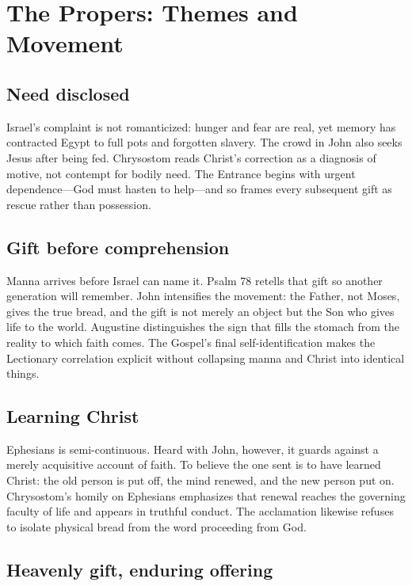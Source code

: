 \label{triptych:brief-synthesis:start}
\section*{The Propers: Themes and Movement}

\subsection*{Need disclosed}

Israel's complaint is not romanticized: hunger and fear are real, yet memory
has contracted Egypt to full pots and forgotten slavery. The crowd in John
also seeks Jesus after being fed. Chrysostom reads Christ's correction as a
diagnosis of motive, not contempt for bodily need. The Entrance begins with
urgent dependence---God must hasten to help---and so frames every subsequent
gift as rescue rather than possession.

\subsection*{Gift before comprehension}

Manna arrives before Israel can name it. Psalm 78 retells that gift so another
generation will remember. John intensifies the movement: the Father, not
Moses, gives the true bread, and the gift is not merely an object but the Son
who gives life to the world. Augustine distinguishes the sign that fills the
stomach from the reality to which faith comes. The Gospel's final
self-identification makes the Lectionary correlation explicit without
collapsing manna and Christ into identical things.

\subsection*{Learning Christ}

Ephesians is semi-continuous. Heard with John, however, it guards against a merely acquisitive account
of faith. To believe the one sent is to have learned Christ: the old person is
put off, the mind renewed, and the new person put on. Chrysostom's homily on
Ephesians emphasizes that renewal reaches the governing faculty of life and
appears in truthful conduct. The acclamation likewise refuses to isolate
physical bread from the word proceeding from God.

\subsection*{Heavenly gift, enduring offering}

